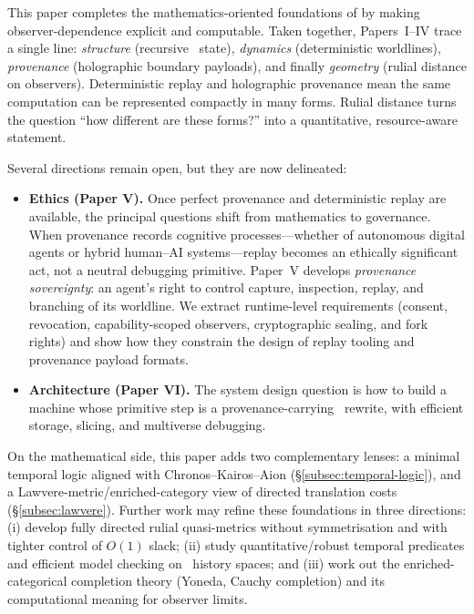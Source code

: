 \documentclass{aion}
\begin{document}
This paper completes the mathematics-oriented foundations of \AION{} by making observer-dependence explicit and computable.
Taken together, Papers~I--IV trace a single line: \emph{structure} (recursive \WARP\ state), \emph{dynamics} (deterministic worldlines),
\emph{provenance} (holographic boundary payloads), and finally \emph{geometry} (rulial distance on observers).
Deterministic replay and holographic provenance mean the same computation can be represented compactly in many forms.
Rulial distance turns the question ``how different are these forms?'' into a quantitative, resource-aware statement.

Several directions remain open, but they are now delineated:
\begin{itemize}[leftmargin=*]
  \item \textbf{Ethics (Paper V).} Once perfect provenance and deterministic replay are available, the principal questions shift from mathematics to governance.
        When provenance records cognitive processes---whether of autonomous digital agents or hybrid human--AI systems---replay becomes an ethically significant act,
        not a neutral debugging primitive.
        Paper~V develops \emph{provenance sovereignty}: an agent's right to control capture, inspection, replay, and branching of its worldline.
        We extract runtime-level requirements (consent, revocation, capability-scoped observers, cryptographic sealing, and fork rights) and show how they constrain
        the design of replay tooling and provenance payload formats.
  \item \textbf{Architecture (Paper VI).} The system design question is how to build a machine whose primitive step is a provenance-carrying \WARP\ rewrite,
        with efficient storage, slicing, and multiverse debugging.
\end{itemize}

On the mathematical side, this paper adds two complementary lenses:
a minimal temporal logic aligned with Chronos--Kairos--Aion (\S\ref{subsec:temporal-logic}),
and a Lawvere-metric/enriched-category view of directed translation costs (\S\ref{subsec:lawvere}).
Further work may refine these foundations in three directions:
(i) develop fully directed rulial quasi-metrics without symmetrisation and with tighter control of $O(1)$ slack;
(ii) study quantitative/robust temporal predicates and efficient model checking on \WARP\ history spaces; and
(iii) work out the enriched-categorical completion theory (Yoneda, Cauchy completion) and its computational meaning for observer limits.
\end{document}
